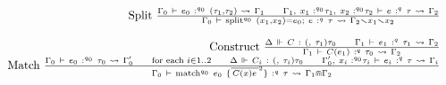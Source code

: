 \[\begin{array}{r}
{\text{Split}\ \frac{{\Gamma_{0}\  \vdash \ e_{0}\ :^{q_{0}}\ {(\tau_{1},\tau_{2})}\  \rightsquigarrow \ \Gamma_{1}}\text{\quad\quad}{\Gamma_{1}{,\ }{x_{1}\text{ :}^{q_{0}}\tau_{1}}{,\ }{x_{2}\text{ :}^{q_{0}}\tau_{2}}\  \vdash \ e\ :^{q}\ \tau\  \rightsquigarrow \ \Gamma_{2}}}{\Gamma_{0}\  \vdash \ {\mathsf{\mathbf{\text{split}}}^{q_{0}}\ {(x_{1},x_{2})} = e_{0};\ e}\ :^{q}\ \tau\  \rightsquigarrow \ \Gamma_{2} \smallsetminus x_{1} \smallsetminus x_{2}}\ } \\
 \\
{\text{Construct}\ \frac{{\Delta\  \Vdash \ C\ :\ {({,\ }\tau_{1})\tau_{0}}}\text{\quad\quad}{\Gamma_{1}\  \vdash \ e_{1}\ :^{q}\ \tau_{1}\  \rightsquigarrow \ \Gamma_{2}}}{\Gamma_{1}\  \vdash \ {C(e_{1})}\ :^{q}\ \tau_{0}\  \rightsquigarrow \ \Gamma_{2}}\ } \\
{\text{Match}\ \frac{{\Gamma_{0}\  \vdash \ e_{0}\ :^{q_{0}}\ \tau_{0}\  \rightsquigarrow \ \Gamma'_{0}}\text{\quad\quad}{\text{for each }i \in 1..2}\text{\quad\quad}{\Delta\  \Vdash \ C_{i}\ :\ {({,\ }\tau_{i})\tau_{0}}}\text{\quad\quad}{\Gamma'_{0}{,\ }{x_{i}\text{ :}^{q_{0}}\tau_{i}}\  \vdash \ e_{i}\ :^{q}\ \tau\  \rightsquigarrow \ \Gamma_{i}}}{\Gamma_{0}\  \vdash \ {\mathsf{\mathbf{\text{match}}}^{q_{0}}\ e_{0}\ \{{\overline{\,{C(x)}e\:}}^{2}\}}\ :^{q}\ \tau\  \rightsquigarrow \ \Gamma_{1} \Cap \Gamma_{2}}\ }
\end{array}\]
